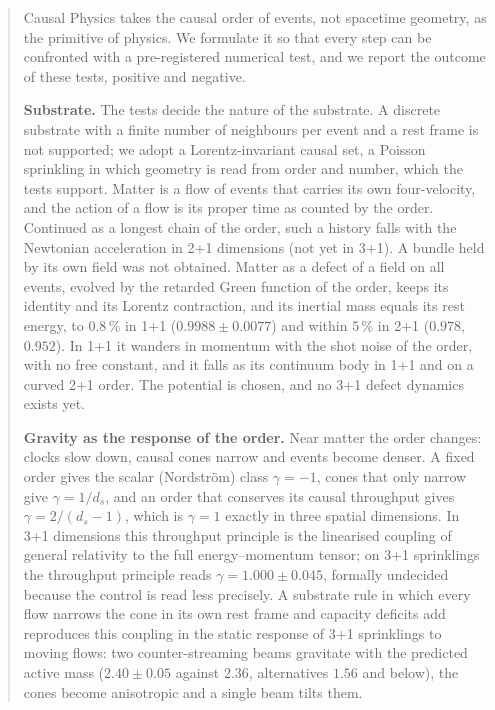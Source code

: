 \begin{abstract}
\noindent
Causal Physics takes the causal order of events, not spacetime geometry, as the primitive of physics.
We formulate it so that every step can be confronted with a pre-registered numerical test, and we
report the outcome of these tests, positive and negative.

\smallskip\noindent
\textbf{Substrate.} The tests decide the nature of the substrate. A discrete substrate with a
finite number of neighbours per event and a rest frame is not supported; we adopt a Lorentz-invariant
causal set, a Poisson sprinkling in which geometry is read from order and number, which the tests support.
Matter is a flow of events that carries its own four-velocity, and the action of a flow is its proper
time as counted by the order. Continued as a longest chain of the order, such a history falls with the Newtonian
acceleration in 2+1 dimensions (not yet in 3+1). A bundle held by its own field was not obtained. Matter as a
defect of a field on all events, evolved by the retarded Green function of the order, keeps its identity and its
Lorentz contraction, and its inertial mass equals its rest energy, to $0.8\,\%$ in 1+1 ($0.9988\pm0.0077$) and
within $5\,\%$ in 2+1 ($0.978$, $0.952$). In 1+1 it wanders in momentum with the shot noise of the order, with no
free constant, and it falls as its continuum body in 1+1 and on a curved 2+1 order. The potential is chosen, and
no 3+1 defect dynamics exists yet.

\smallskip\noindent
\textbf{Gravity as the response of the order.} Near matter the order changes: clocks slow down, causal
cones narrow and events become denser. A fixed order gives the scalar (Nordstr\"om) class
$\gamma=-1$, cones that only narrow give $\gamma=1/d_s$, and an order that conserves its causal
throughput gives $\gamma=2/(d_s-1)$, which is $\gamma=1$ exactly in three spatial dimensions. In
3+1 dimensions this throughput principle is the linearised coupling of general relativity to the full
energy--momentum tensor; on 3+1 sprinklings the throughput principle reads $\gamma=1.000\pm0.045$, formally
undecided because the control is read less precisely. A substrate rule in which every flow narrows the cone in its
own rest frame and capacity deficits add reproduces this coupling in the static response of 3+1 sprinklings to
moving flows: two counter-streaming
beams gravitate with the predicted active mass ($2.40\pm0.05$ against $2.36$, alternatives $1.56$
and below), the cones become anisotropic and a single beam tilts them.


\end{abstract}
